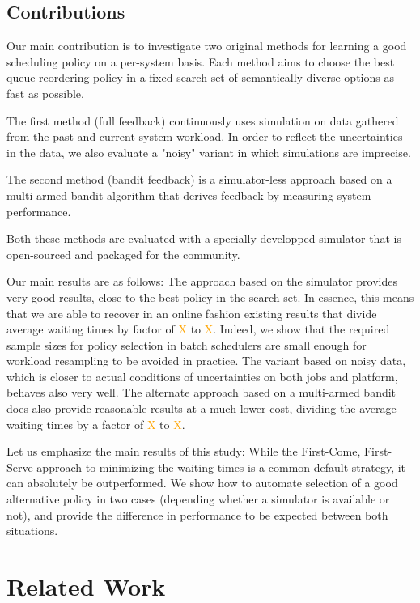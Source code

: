 \documentclass[sigconf]{acmart}
\begin{document}
\subsection{Contributions}

Our main contribution is to investigate two original methods for learning a
good scheduling policy on a per-system basis.  Each method aims to choose
the best queue reordering policy in a fixed search set of semantically diverse
options as fast as possible.

The first method (full feedback) continuously uses simulation on data gathered
from the past and current system workload. In order to reflect the
uncertainties in the data, we also evaluate a "noisy" variant in which
simulations are imprecise.

The second method (bandit feedback) is a simulator-less approach based on a
multi-armed bandit algorithm that derives feedback by measuring system
performance.

Both these methods are evaluated with a specially developped simulator that is
open-sourced and packaged for the community.

\bigskip

Our main results are as follows: The approach based on the simulator provides
very good results, close to the best policy in the search set. In essence, this
means that we are able to recover in an online fashion existing results that
divide average waiting times by factor of \textcolor{orange}{X} to
\textcolor{orange}{X}. Indeed, we show that the required sample sizes for
policy selection in batch schedulers are small enough for workload resampling to
be avoided in practice. The variant based on noisy data, which is closer to
actual conditions of uncertainties on both jobs and platform, behaves also very
well. The alternate approach based on a multi-armed bandit does also provide
reasonable results at a much lower cost, dividing the average waiting times by
a factor of \textcolor{orange}{X} to \textcolor{orange}{X}.

Let us emphasize the main results of this study: While the First-Come,
First-Serve approach to minimizing the waiting times is a common default
strategy, it can absolutely be outperformed.  We show how to automate selection
of a good alternative policy in two cases (depending whether a simulator is
available or not), and provide the difference in performance to be expected
between both situations.

\section{Related Work}
\label{sec:rw}
\end{document}
